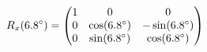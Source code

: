 \documentclass[preview]{standalone}
\begin{document}
\begin{align*}
\special{dvisvgm:raw <g id='unique000'>}R_x(6.8^\circ) = \begin{pmatrix} 1 & 0 & 0 \\ 0 & \cos(6.8^\circ) & -\sin(6.8^\circ) \\ 0 & \sin(6.8^\circ) & \cos(6.8^\circ) \end{pmatrix}\special{dvisvgm:raw </g>}
\end{align*}
\end{document}

